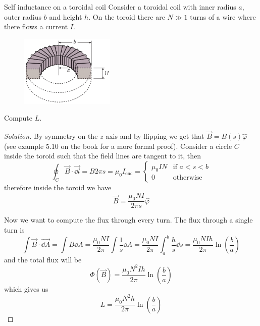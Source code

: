 \documentclass[12pt]{extarticle}
\begin{document}
\begin{example}{Self inductance on a toroidal coil}{}
    Consider a toroidal coil with inner radius $a$, outer radius $b$ and height $h$.
    On the toroid there are $N \gg 1$ turns of a wire where there flows a current $I$.

    \begin{figure}[H]
        \centering
        \includegraphics[width=0.4\textwidth]{assets/physics-2/toroidal-coil.jpg}
    \end{figure}

    Compute $L$.
\end{example}

\begin{proof}[Solution]
    By symmetry on the $z$ axis and by flipping we get that $\vec B = B(s) \hat \varphi$
    (see example 5.10 on the book for a more formal proof).
    Consider a circle $C$ inside the toroid such that the field lines are tangent to it,
    then
    \begin{equation}
        \oint_C \vec B \cdot \vec{\dd l} = B 2 \pi s = \mu_0 I_\text{enc} =
        \begin{cases}
            \mu_0 I N & \text{if } a < s < b \\
            0         & \text{otherwise}
        \end{cases}
    \end{equation}
    therefore inside the toroid we have
    \begin{equation}
        \vec B = \frac{\mu_0 N I}{2 \pi s} \hat \varphi
    \end{equation}

    Now we want to compute the flux through every turn.
    The flux through a single turn is
    \begin{equation}
        \int \vec B \cdot \vec{\dd A} = \int B \dd{A} = \frac{\mu_0 N I}{2 \pi} \int \frac{1}{s} \dd A
        = \frac{\mu_0 N I}{2 \pi} \int_a^b \frac{h}{s} \dd s
        = \frac{\mu_0 N I h}{2 \pi} \ln \left( \frac{b}{a} \right)
    \end{equation}
    and the total flux will be
    \begin{equation}
        \Phi(\vec B) = \frac{\mu_0 N^2 I h}{2 \pi} \ln \left( \frac{b}{a} \right)
    \end{equation}
    which gives us
    \begin{equation}
        L = \frac{\mu_0 N^2 h}{2 \pi} \ln \left(\frac{b}{a}\right)
    \end{equation}
\end{proof}
\end{document}
